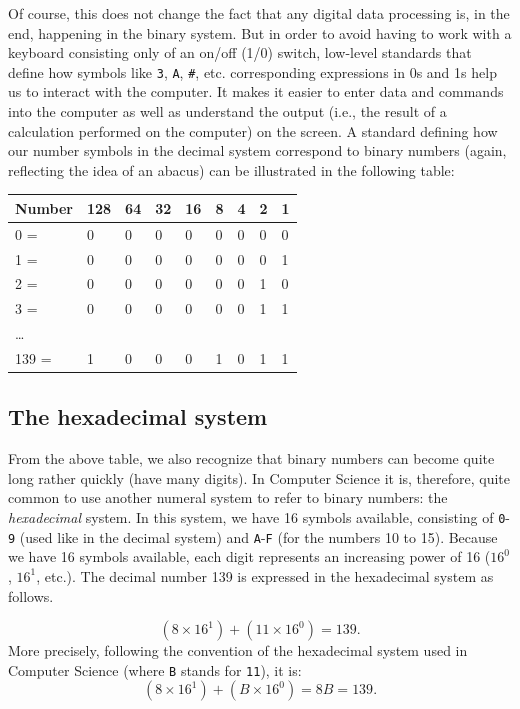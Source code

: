 \documentclass[
  12pt,
]{style/krantz}
\begin{document}
Of course, this does not change the fact that any digital data processing is, in the end, happening in the binary system. But in order to avoid having to work with a keyboard consisting only of an on/off (1/0) switch, low-level standards that define how symbols like \texttt{3}, \texttt{A}, \texttt{\#}, etc. corresponding expressions in 0s and 1s help us to interact with the computer. It makes it easier to enter data and commands into the computer as well as understand the output (i.e., the result of a calculation performed on the computer) on the screen. A standard defining how our number symbols in the decimal system correspond to binary numbers (again, reflecting the idea of an abacus) can be illustrated in the following table:

\begin{longtable}[]{@{}lllllllll@{}}
\toprule
Number & 128 & 64 & 32 & 16 & 8 & 4 & 2 & 1 \\
\midrule
\endhead
0 = & 0 & 0 & 0 & 0 & 0 & 0 & 0 & 0 \\
1 = & 0 & 0 & 0 & 0 & 0 & 0 & 0 & 1 \\
2 = & 0 & 0 & 0 & 0 & 0 & 0 & 1 & 0 \\
3 = & 0 & 0 & 0 & 0 & 0 & 0 & 1 & 1 \\
\ldots{} & & & & & & & & \\
139 = & 1 & 0 & 0 & 0 & 1 & 0 & 1 & 1 \\
\bottomrule
\end{longtable}

\hypertarget{the-hexadecimal-system}{%
\subsection{The hexadecimal system}\label{the-hexadecimal-system}}

From the above table, we also recognize that binary numbers can become quite long rather quickly (have many digits). In Computer Science it is, therefore, quite common to use another numeral system to refer to binary numbers: the \emph{hexadecimal} system. In this system, we have 16 symbols available, consisting of \texttt{0}-\texttt{9} (used like in the decimal system) and \texttt{A}-\texttt{F} (for the numbers 10 to 15). Because we have 16 symbols available, each digit represents an increasing power of 16 (\(16^{0}\), \(16^{1}\), etc.). The decimal number 139 is expressed in the hexadecimal system as follows.

\[(8\times 16^1) +  (11\times 16^0) = 139.\]
More precisely, following the convention of the hexadecimal system used in Computer Science (where \texttt{B} stands for \texttt{11}), it is:
\[(8\times 16^1) +  (B\times 16^0) = 8B = 139.\]
\end{document}
